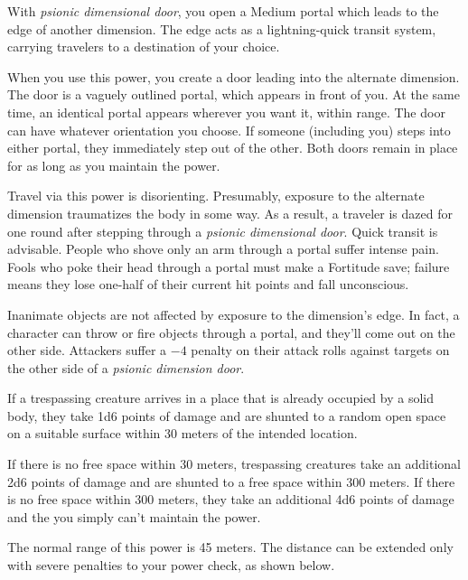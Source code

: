 {
	With \emph{psionic dimensional door}, you open a Medium portal which leads to the edge of another dimension. The edge acts as a lightning-quick transit system, carrying travelers to a destination of your choice.

	When you use this power, you create a door leading into the alternate dimension. The door is a vaguely outlined portal, which appears in front of you. At the same time, an identical portal appears wherever you want it, within range. The door can have whatever orientation you choose. If someone (including you) steps into either portal, they immediately step out of the other. Both doors remain in place for as long as you maintain the power.


	Travel via this power is disorienting. Presumably, exposure to the alternate dimension traumatizes the body in some way. As a result, a traveler is dazed for one round after stepping through a \emph{psionic dimensional door}. Quick transit is advisable. People who shove only an arm through a portal suffer intense pain. Fools who poke their head through a portal must make a Fortitude save; failure means they lose one-half of their current hit points and fall unconscious.

	Inanimate objects are not affected by exposure to the dimension's edge. In fact, a character can throw or fire objects through a portal, and they'll come out on the other side. Attackers suffer a $-4$ penalty on their attack rolls against targets on the other side of a \emph{psionic dimension door}.

	If a trespassing creature arrives in a place that is already occupied by a solid body, they take 1d6 points of damage and are shunted to a random open space on a suitable surface within 30 meters of the intended location.

	If there is no free space within 30 meters, trespassing creatures take an additional 2d6 points of damage and are shunted to a free space within 300 meters. If there is no free space within 300 meters, they take an additional 4d6 points of damage and the you simply can't maintain the power.

	The normal range of this power is 45 meters. The distance can be extended only with severe penalties to your power check, as shown below.

}
